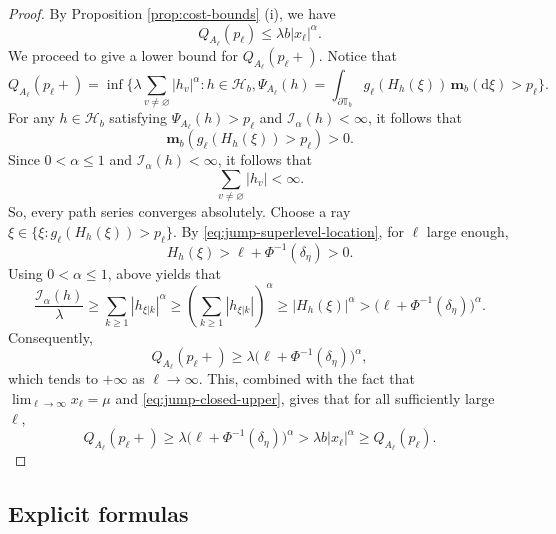\documentclass[a4paper, 11pt]{article}
\newcommand{\1}{\mathbf 1}
\theoremstyle{plain}
\begin{document}
\begin{proof}
By Proposition \ref{prop:cost-bounds} (i), we have
\begin{equation}\label{eq:jump-closed-upper}
  Q_{A_\ell}(p_\ell)\leq\lambda b|x_\ell|^\alpha.
\end{equation}
We proceed to give a lower bound for $Q_{A_\ell}(p_\ell+)$. Notice that
$$
Q_{A_\ell}(p_\ell+)=\inf\Big\{\lambda\sum_{v\neq\varnothing}|h_v|^\alpha:h\in\mathcal{H}_b, \Psi_{A_\ell}(h)=\int_{\partial\mathbb{T}_b}g_{\ell}(H_h(\xi))\,\mathbf m_b(\mathrm{d}\xi)>p_\ell\Big\}.
$$
For any \(h\in\mathcal{H}_b\) satisfying
\(\Psi_{A_\ell}(h)>p_\ell\) and
\(\mathcal{I_{\alpha}}(h)<\infty\), it follows that
\[
  \mathbf m_b(g_\ell(H_h(\xi))>p_\ell)>0.
\]
Since \(0<\alpha\leq1\) and \(\mathcal{I_{\alpha}}(h)<\infty\), it follows that
\[
  \sum_{v\neq\varnothing}|h_v|<\infty.
\]
So, every path series converges absolutely.
Choose a ray \(\xi\in\{\xi:g_\ell(H_h(\xi))>p_\ell\}\). By \eqref{eq:jump-superlevel-location}, for $\ell$ large enough,
\[
  H_h(\xi)>\ell+\Phi^{-1}(\delta_\eta)>0.
\]
Using \(0<\alpha\leq1\), above yields that
\[
  \frac{\mathcal{I_{\alpha}}(h)}{\lambda}
  \geq\sum_{k\geq1}|h_{\xi|k}|^\alpha
  \geq
  \left(\sum_{k\geq1}|h_{\xi|k}|\right)^\alpha
  \geq|H_h(\xi)|^\alpha
  >
  \bigl(\ell+\Phi^{-1}(\delta_\eta)\bigr)^\alpha.
\]
Consequently,
\[
  Q_{A_\ell}(p_\ell+)
  \geq
  \lambda\bigl(\ell+\Phi^{-1}(\delta_\eta)\bigr)^\alpha,
\]
which tends to $+\infty$ as $\ell\to\infty$.
This, combined with the fact that \(\lim_{\ell\to\infty}x_\ell=\mu\) and \eqref{eq:jump-closed-upper},
gives that for all sufficiently large \(\ell\),
\[
  Q_{A_\ell}(p_\ell+)
  \geq
  \lambda\bigl(\ell+\Phi^{-1}(\delta_\eta)\bigr)^\alpha
  >
  \lambda b|x_\ell|^\alpha
  \geq
  Q_{A_\ell}(p_\ell).
\]
\end{proof}

\subsection{Explicit formulas}
\end{document}

